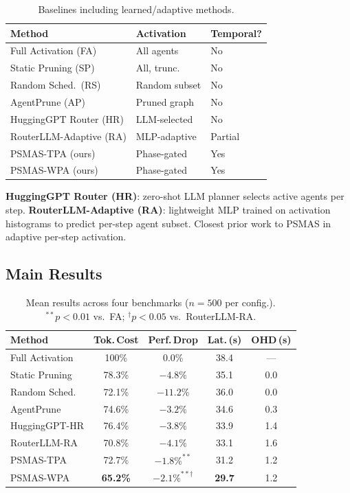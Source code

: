 \documentclass[10pt,twocolumn]{article}
\theoremstyle{plain}
\theoremstyle{definition}
\theoremstyle{remark}
\begin{document}
\begin{table}[h]
\centering\scriptsize
\caption{Baselines including learned/adaptive methods.}
\label{tab:baselines}
\setlength{\tabcolsep}{4pt}
\begin{tabular}{@{}lll@{}}
\toprule
\textbf{Method} & \textbf{Activation} & \textbf{Temporal?}\\
\midrule
Full Activation (FA)    & All agents    & No\\
Static Pruning (SP)     & All, trunc.   & No\\
Random Sched.\ (RS)     & Random subset & No\\
AgentPrune (AP)         & Pruned graph  & No\\
HuggingGPT Router (HR)  & LLM-selected  & No\\
RouterLLM-Adaptive (RA) & MLP-adaptive  & Partial\\
\midrule
PSMAS-TPA (ours)        & Phase-gated   & Yes\\
PSMAS-WPA (ours)        & Phase-gated   & Yes\\
\bottomrule
\end{tabular}
\end{table}

\textbf{HuggingGPT Router (HR)}: zero-shot LLM planner selects active
agents per step.
\textbf{RouterLLM-Adaptive (RA)}: lightweight MLP trained on activation
histograms to predict per-step agent subset.  Closest prior
work to PSMAS in adaptive per-step activation.

\subsection{Main Results}

\begin{table}[t]
\centering\scriptsize
\caption{%
  Mean results across four benchmarks ($n{=}500$ per config.).
  $^{**}p{<}0.01$ vs.\ FA;
  $^\dagger p{<}0.05$ vs.\ RouterLLM-RA.}
\label{tab:main}
\setlength{\tabcolsep}{3pt}
\begin{tabular}{@{}lcccc@{}}
\toprule
\textbf{Method} & \textbf{Tok.\,Cost} & \textbf{Perf.\,Drop} & \textbf{Lat.\,(s)} & \textbf{OHD\,(s)}\\
\midrule
Full Activation & 100\%           & 0.0\%         & 38.4 & ---\\
Static Pruning  & 78.3\%          & $-4.8\%$      & 35.1 & 0.0\\
Random Sched.   & 72.1\%          & $-11.2\%$     & 36.0 & 0.0\\
AgentPrune      & 74.6\%          & $-3.2\%$      & 34.6 & 0.3\\
HuggingGPT-HR   & 76.4\%          & $-3.8\%$      & 33.9 & 1.4\\
RouterLLM-RA    & 70.8\%          & $-4.1\%$      & 33.1 & 1.6\\
\midrule
PSMAS-TPA       & 72.7\%          & $-1.8\%^{**}$ & 31.2 & 1.2\\
PSMAS-WPA       & \textbf{65.2\%} & $-2.1\%^{**\dagger}$& \textbf{29.7}& 1.2\\
\bottomrule
\end{tabular}
\end{table}
\end{document}
